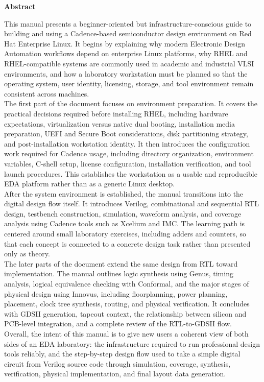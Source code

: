 \newpage
\begin{center}
{\headingfont\LARGE\bfseries Abstract} \\
\end{center}


This manual presents a beginner-oriented but infrastructure-conscious guide to building and using a
Cadence-based semiconductor design environment on Red Hat Enterprise Linux. It begins by explaining
why modern Electronic Design Automation workflows depend on enterprise Linux platforms, why RHEL and
RHEL-compatible systems are commonly used in academic and industrial VLSI environments, and how a
laboratory workstation must be planned so that the operating system, user identity, licensing,
storage, and tool environment remain consistent across machines.\\

\noindent The first part of the document focuses on environment preparation. It covers the practical
decisions required before installing RHEL, including hardware expectations, virtualization versus
native dual booting, installation media preparation, UEFI and Secure Boot considerations, disk
partitioning strategy, and post-installation workstation identity. It then introduces the
configuration work required for Cadence usage, including directory organization, environment
variables, C-shell setup, license configuration, installation verification, and tool launch
procedures. This establishes the workstation as a usable and reproducible EDA platform rather than
as a generic Linux desktop.\\

\noindent After the system environment is established, the manual transitions into the digital design
flow itself. It introduces Verilog, combinational and sequential RTL design, testbench construction,
simulation, waveform analysis, and coverage analysis using Cadence tools such as Xcelium and IMC.
The learning path is centered around small laboratory exercises, including adders and counters, so
that each concept is connected to a concrete design task rather than presented only as theory.\\

\noindent The later parts of the document extend the same design from RTL toward implementation. The
manual outlines logic synthesis using Genus, timing analysis, logical equivalence checking with
Conformal, and the major stages of physical design using Innovus, including floorplanning, power
planning, placement, clock tree synthesis, routing, and physical verification. It concludes with
GDSII generation, tapeout context, the relationship between silicon and PCB-level integration, and a
complete review of the RTL-to-GDSII flow.\\

\noindent Overall, the intent of this manual is to give new users a coherent view of both sides of an
EDA laboratory: the infrastructure required to run professional design tools reliably, and the
step-by-step design flow used to take a simple digital circuit from Verilog source code through
simulation, coverage, synthesis, verification, physical implementation, and final layout data
generation.\\

\newpage
